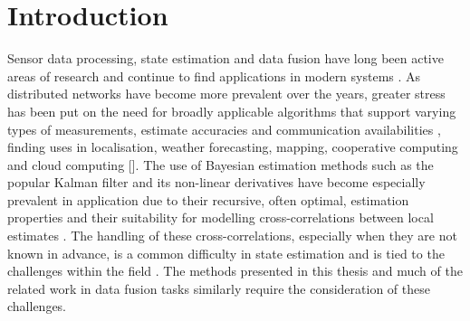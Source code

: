 
\chapter{Introduction}
Sensor data processing, state estimation and data fusion have long been active areas of research and continue to find applications in modern systems \cite{andersonOptimalFiltering1979,simonOptimalStateEstimation2006}. As distributed networks have become more prevalent over the years, greater stress has been put on the need for broadly applicable algorithms that support varying types of measurements, estimate accuracies and communication availabilities \cite{mutambaraDecentralizedEstimationControl1998,ligginsDistributedDataFusion2012}, finding uses in localisation, weather forecasting, mapping, cooperative computing and cloud computing []. The use of Bayesian estimation methods such as the popular Kalman filter and its non-linear derivatives have become especially prevalent in application due to their recursive, often optimal, estimation properties and their suitability for modelling cross-correlations between local estimates \cite{chongFortyYearsDistributed2017,haugBayesianEstimationTracking2012}. The handling of these cross-correlations, especially when they are not known in advance, is a common difficulty in state estimation and is tied to the challenges within the field \cite{noackTreatmentDependentInformation2017}. The methods presented in this thesis and much of the related work in data fusion tasks similarly require the consideration of these challenges.

